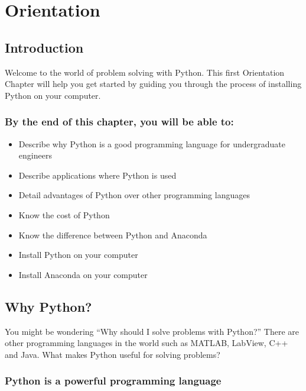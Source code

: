 \documentclass{book}
\providecommand{\tightlist}{%
      \setlength{\itemsep}{0pt}\setlength{\parskip}{0pt}}
\begin{document}
    \chapter{Orientation}\label{orientation}

    \section{Introduction}\label{introduction}

    Welcome to the world of problem solving with Python. This first
Orientation Chapter will help you get started by guiding you through the
process of installing Python on your computer.

    \subsection{By the end of this chapter, you will be able
to:}\label{by-the-end-of-this-chapter-you-will-be-able-to}

\begin{itemize}
\tightlist
\item
  Describe why Python is a good programming language for undergraduate
  engineers
\item
  Describe applications where Python is used
\item
  Detail advantages of Python over other programming languages
\item
  Know the cost of Python
\item
  Know the difference between Python and Anaconda
\item
  Install Python on your computer
\item
  Install Anaconda on your computer
\end{itemize}

    \section{Why Python?}\label{why-python}

    You might be wondering ``Why should I solve problems with Python?''
There are other programming languages in the world such as MATLAB,
LabView, C++ and Java. What makes Python useful for solving problems?

    \subsection{Python is a powerful programming
language}\label{python-is-a-powerful-programming-language}
\end{document}
